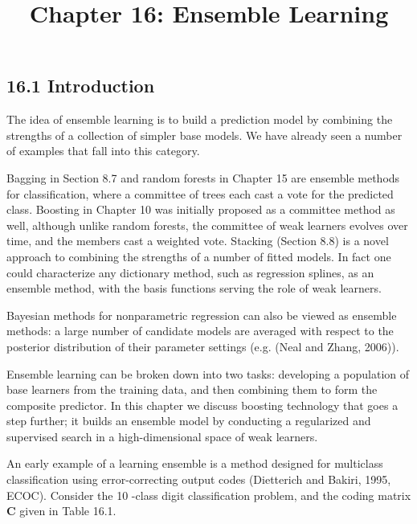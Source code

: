 \documentclass[10pt]{article}
\title{Chapter 16: Ensemble Learning}
\author{}
\date{}
\begin{document}
\maketitle

\subsection*{16.1 Introduction}
The idea of ensemble learning is to build a prediction model by combining the strengths of a collection of simpler base models. We have already seen a number of examples that fall into this category.

Bagging in Section 8.7 and random forests in Chapter 15 are ensemble methods for classification, where a committee of trees each cast a vote for the predicted class. Boosting in Chapter 10 was initially proposed as a committee method as well, although unlike random forests, the committee of weak learners evolves over time, and the members cast a weighted vote. Stacking (Section 8.8) is a novel approach to combining the strengths of a number of fitted models. In fact one could characterize any dictionary method, such as regression splines, as an ensemble method, with the basis functions serving the role of weak learners.

Bayesian methods for nonparametric regression can also be viewed as ensemble methods: a large number of candidate models are averaged with respect to the posterior distribution of their parameter settings (e.g. (Neal and Zhang, 2006)).

Ensemble learning can be broken down into two tasks: developing a population of base learners from the training data, and then combining them to form the composite predictor. In this chapter we discuss boosting technology that goes a step further; it builds an ensemble model by conducting a regularized and supervised search in a high-dimensional space of weak learners.

An early example of a learning ensemble is a method designed for multiclass classification using error-correcting output codes (Dietterich and Bakiri, 1995, ECOC). Consider the 10 -class digit classification problem, and the coding matrix $\mathbf{C}$ given in Table 16.1.
\end{document}
